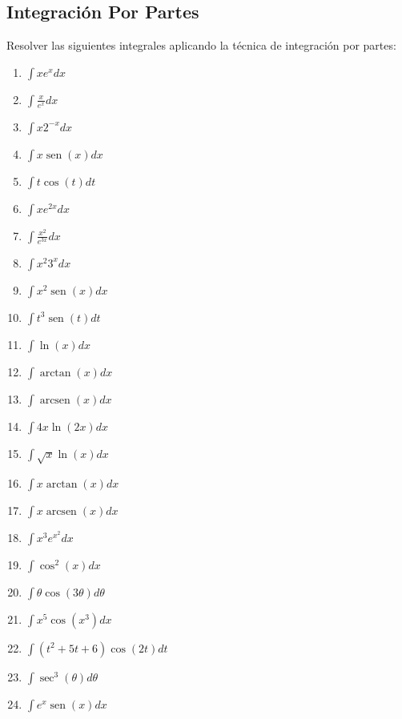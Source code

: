 \documentclass{article}
\begin{document}
\begin{multicols}{2}
\section*{Integración Por Partes}
Resolver las siguientes integrales aplicando la técnica de integración por partes:

\begin{enumerate}
    \item $\displaystyle \int x e^x dx$
    \item $\displaystyle \int \frac{x}{e^x} dx$
    \item $\displaystyle \int x 2^{-x} dx$
    \item $\displaystyle \int x \operatorname{sen}(x) dx$    
    \item $\displaystyle \int t \cos(t) dt$
    \item $\displaystyle \int x e^{2x} dx$
    \item $\displaystyle \int \frac{x^2}{e^{3x}} dx$
    \item $\displaystyle \int x^2 3^x dx$
    \item $\displaystyle \int x^2 \operatorname{sen}(x) dx$
    \item $\displaystyle \int t^3 \operatorname{sen}(t) dt$
    \item $\displaystyle \int \ln(x) dx$
    \item $\displaystyle \int \operatorname{arctan}(x) dx$
    \item $\displaystyle \int \operatorname{arcsen}(x) dx$
    \item $\displaystyle \int 4x \ln(2x) dx$
    \item $\displaystyle \int \sqrt{x} \ln(x)dx$
    \item $\displaystyle \int x \operatorname{arctan}(x) dx$
    \item $\displaystyle \int x \operatorname{arcsen}(x) dx$
    \item $\displaystyle \int x^3 e^{x^2} dx$
    \item $\displaystyle \int \cos^2(x) dx$
    \item $\displaystyle \int \theta \cos (3\theta) d\theta$
    \item $\displaystyle \int x^5 \cos(x^3) dx$
    \item $\displaystyle \int (t^2 + 5t + 6) \cos (2t) dt$
    \item $\displaystyle \int \sec^3 (\theta) d\theta$
    \item $\displaystyle \int e^x \operatorname{sen}(x) dx$

\end{enumerate}
\end{multicols}
\end{document}
